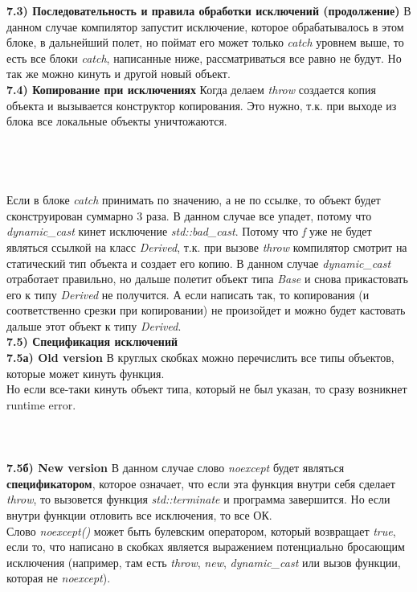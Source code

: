 \documentclass{article}
\begin{document}
\noindent \textbf{7.3) Последовательность и правила обработки исключений (продолжение)}
В данном случае компилятор запустит исключение, которое обрабатывалось в этом блоке, в дальнейший полет, но поймат его может только \textit{catch} уровнем выше, то есть все блоки \textit{catch}, написанные ниже, рассматриваться все равно не будут. 	
Но так же можно кинуть и другой новый объект.\\
\noindent \textbf{7.4) Копирование при исключениях}
Когда делаем \textit{throw} создается копия объекта и вызывается конструктор копирования. Это нужно, т.к. при выходе из блока все локальные объекты уничтожаются.\\\\\\\\\\
Если в блоке \textit{catch} принимать по значению, а не по ссылке, то объект будет сконструирован суммарно 3 раза.
В данном случае все упадет, потому что \textit{dynamic\_cast} кинет исключение \textit{std::bad\_cast}. Потому что \textit{f} уже не будет являться ссылкой на класс \textit{Derived}, т.к. при вызове \textit{throw} компилятор смотрит на статический тип объекта и создает его копию.
В данном случае \textit{dynamic\_cast} отработает правильно, но дальше полетит объект типа \textit{Base} и снова прикастовать его к типу \textit{Derived} не получится.
А если написать так, то копирования (и соответственно срезки при копировании) не произойдет и можно будет кастовать дальше этот объект к типу \textit{Derived}.\\
\noindent \textbf{7.5) Спецификация исключений}\\
\noindent \textbf{7.5а) Old version}
В круглых скобках можно перечислить все типы объектов, которые может кинуть функция.\\
Но если все-таки кинуть объект типа, который не был указан, то сразу возникнет runtime error. \\\\\\\\
\noindent \textbf{7.5б) New version}
В данном случае слово \textit{noexcept} будет являться \textbf{спецификатором}, которое означает, что если эта функция внутри себя сделает \textit{throw}, то вызовется функция \textit{std::terminate} и программа завершится. Но если внутри функции отловить все исключения, то все ОК.\\
Слово \textit{noexcept()} может быть булевским оператором, который возвращает \textit{true}, если то, что написано в скобках является выражением потенциально бросающим исключения (например, там есть \textit{throw}, \textit{new}, \textit{dynamic\_cast} или вызов функции, которая не \textit{noexcept}). 
\end{document}
